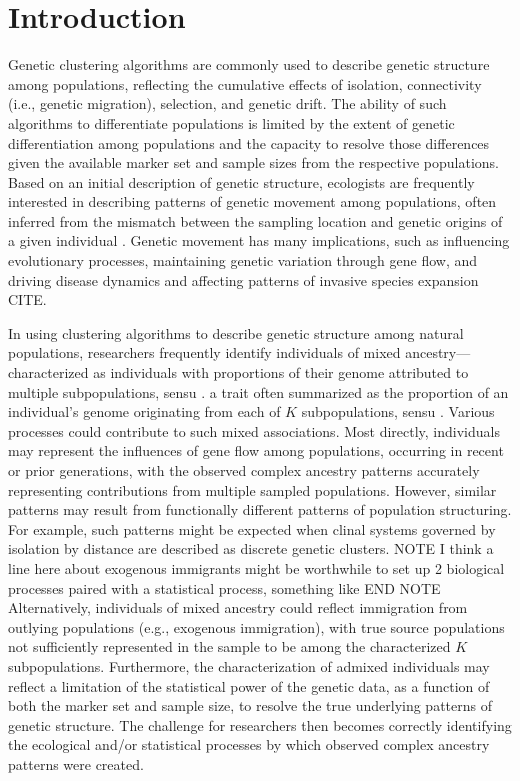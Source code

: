 
\section*{Introduction}

Genetic clustering algorithms are commonly used to describe genetic structure among populations, reflecting the cumulative 
effects of isolation, connectivity (i.e., genetic migration), selection, and genetic drift.  The ability of such algorithms to differentiate populations 
is limited by the extent of genetic differentiation among populations and the capacity to resolve those differences given the available marker 
set and sample sizes from the respective populations.  Based on an initial description of genetic structure, ecologists are frequently 
interested in describing patterns of genetic movement among populations, often inferred from the mismatch between the sampling location 
and genetic origins of a given individual \citep{paetkau1995microsatellite,wilson2003bayesian}.  Genetic movement has many implications, 
such as influencing evolutionary processes, maintaining genetic variation through gene flow, and driving disease dynamics 
\citep{huestis2019windborne} and affecting patterns of invasive species expansion CITE.

In using clustering algorithms to describe genetic structure among natural populations, researchers frequently identify individuals of 
mixed ancestry---
characterized as individuals with proportions of their genome attributed to multiple subpopulations, sensu \citet{pritchard2000inference}.
a trait often summarized as the proportion of an individual’s genome originating from each of $K$ subpopulations, sensu 
\citet{pritchard2000inference}.  Various processes could contribute to such mixed associations.  Most directly, individuals may represent the 
influences of gene flow among populations, occurring in recent or prior generations, with the observed complex ancestry patterns accurately 
representing contributions from multiple sampled populations.  However, similar patterns may result from functionally different patterns of 
population structuring.  For example, such patterns might be expected when clinal systems governed by isolation by distance are described 
as discrete genetic clusters.
NOTE I think a line here about exogenous immigrants might be worthwhile to set up 2 biological processes paired with a statistical process, 
something like END NOTE
Alternatively, individuals of mixed ancestry could reflect immigration from outlying populations (e.g., exogenous immigration), with true source 
populations not sufficiently
represented in the sample to be among the characterized $K$ subpopulations.
Furthermore, the characterization of admixed individuals may reflect a limitation of the statistical power of the genetic data,
as a function of both the marker set and sample size, to resolve the true underlying patterns of genetic structure.
 The challenge for researchers then becomes correctly identifying the ecological and/or statistical processes by which observed complex 
 ancestry patterns were created.

